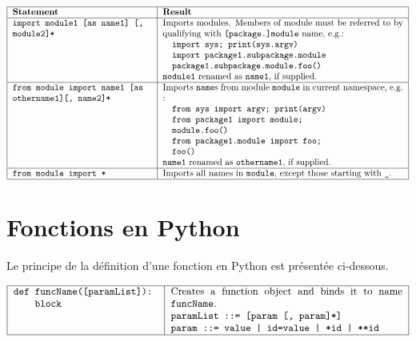 $$\begin{tabular}{|p{5.5cm}|p{9.5cm}|}
\hline
\bf Statement & \bf Result \\
\hline
{\tt import module1 [as name1] [, module2]*} 	& Imports modules. 
	Members of module must be referred to by qualifying with {\tt [package.]module} name, e.g.:\newline
	{\tt \mbox{}\ \ import sys; print(sys.argv)\newline
	\mbox{}\ \ import package1.subpackage.module\newline
	\mbox{}\ \ package1.subpackage.module.foo()}\newline
	{\tt module1} renamed as {\tt name1}, if supplied.\\
\hline
{\tt \tt from module import name1 [as othername1][, name2]*} 	& Imports {\tt name}s from module {\tt module} 
	in current namespace, e.g. :\newline
{\tt 
\mbox{}\ \ from sys import argv; print(argv)\newline
\mbox{}\ \ from package1 import module; \newline\mbox{}\ \ module.foo()\newline
\mbox{}\ \ from package1.module import foo; \newline\mbox{}\ \ foo()}\newline
{\tt name1} renamed as {\tt othername1}, if supplied.\\
\hline
{\tt from module import * } 	 & Imports all names in {\tt module}, except those starting with {\tt \_}. \\
\hline
\end{tabular}$$

\section{Fonctions en {\sc Python}}\label{python:def}
Le principe de la définition d'une fonction en {\sc Python} est présentée
ci-dessous.

{\footnotesize
$$\begin{tabular}{|p{5cm}|p{8cm}|}
\hline
\tt def funcName([paramList]):\newline \mbox{}\ \ \ \ block & 
	Creates a function object and binds it to name {\tt funcName}.\newline
	{\tt paramList ::= [param [, param]*]}\newline
	{\tt param ::= value | id=value | *id | **id}\\
\hline
\end{tabular}$$
}

